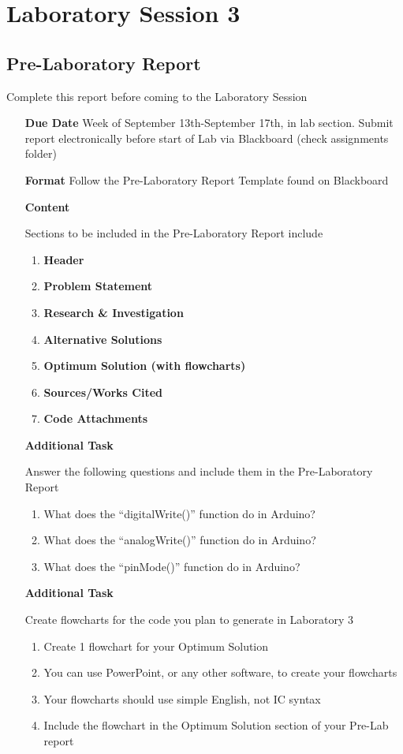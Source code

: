 \chapter{Laboratory Session 3}
\section{Pre-Laboratory Report}
	Complete this report before coming to the Laboratory Session
\begin{itemize}
	\item[\textbf{Due Date}]{Week of September 13th-September 17th, \the\year \space in lab section. Submit report electronically before start of Lab via Blackboard (check assignments folder)}
	\item[\textbf{Format}]{Follow the Pre-Laboratory Report Template found on Blackboard}
	\item[\textbf{Content}]{Sections to be included in the Pre-Laboratory Report include
		\begin{enumerate}
			\item \textbf{Header}
			\item \textbf{Problem Statement}
			\item \textbf{Research \& Investigation}
			\item \textbf{Alternative Solutions}
			\item \textbf{Optimum Solution (with flowcharts)}
			\item \textbf{Sources/Works Cited}
			\item \textbf{Code Attachments}
		\end{enumerate}
		
	}
	\item[\textbf{Additional Task}]{Answer the following questions and include them in the Pre-Laboratory Report
		\begin{enumerate}[label=\alph*.]
			\item What does the “digitalWrite()” function do in Arduino?
			\item What does the “analogWrite()” function do in Arduino?
			\item What does the “pinMode()” function do in Arduino? 
		\end{enumerate}	
	}
	\item[\textbf{Additional Task}]{Create flowcharts for the code you plan to generate in Laboratory 3
		\begin{enumerate}[label=\alph*.]
			\item Create 1 flowchart for your Optimum Solution
			\item You can use PowerPoint, or any other software, to create your flowcharts
			\item Your flowcharts should use simple English, not IC syntax
			\item Include the flowchart in the Optimum Solution section of your Pre-Lab report
		\end{enumerate}
	
	}
	
\end{itemize}
